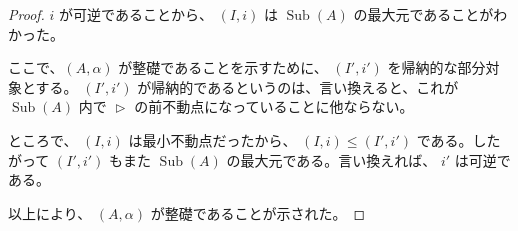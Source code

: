 \documentclass[dvipdfmx,uplatex,papersize,a4paper,10pt]{jsarticle}
\theoremstyle{definition}
\DeclareMathOperator{\Sub}{Sub}
\newcommand{\nexttime}{\mathop{\triangleright}}
\begin{document}
\begin{proof}
  $i$ が可逆であることから、 $(I, i)$ は $\Sub(A)$ の最大元であることがわかった。

  ここで、$(A, \alpha)$ が整礎であることを示すために、 $(I', i')$ を帰納的な部分対象とする。 $(I', i')$ が帰納的であるというのは、言い換えると、これが $\Sub(A)$ 内で $\nexttime$ の前不動点になっていることに他ならない。

  ところで、 $(I, i)$ は最小不動点だったから、 $(I, i) \leq (I', i')$ である。したがって $(I', i')$ もまた $\Sub(A)$ の最大元である。言い換えれば、 $i'$ は可逆である。

  以上により、 $(A, \alpha)$ が整礎であることが示された。
\end{proof}



\end{document}
